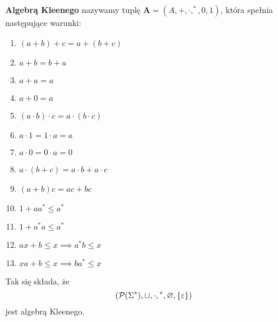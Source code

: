 \begin{definition}
    \textbf{Algebrą Kleenego} nazywamy tuplę \( \mathbf{A} = (A, +, \cdot, ^*, 0, 1) \), która spełnia następujące warunki:
    \begin{enumerate}
        \item \((a + b) + c = a + (b + c)\)
        \item \(a + b = b + a\)
        \item \(a + a = a\)
        \item \(a + 0 = a\)
        \item \( (a \cdot b) \cdot c = a \cdot (b \cdot c) \)
        \item \( a \cdot 1 = 1 \cdot a = a \)
        \item \( a \cdot 0 = 0 \cdot a = 0 \)
        \item \( a\cdot(b + c) = a\cdot b + a \cdot c \)
        \item \( (a + b)c = ac + bc \)
        \item \( 1 + aa^* \leq a^* \)
        \item \( 1 + a^*a \leq a^* \)
        \item \( ax + b \leq x \implies a^*b \leq x \)
        \item \( xa + b \leq x \implies ba^* \leq x \)
    \end{enumerate}
\end{definition}
Tak się składa, że
\begin{equation*}
    \pars{\powerset\pars{\Sigma^*}, {\cup}, {\cdot}, {}^*, \emptyset, \set{\eps}}
\end{equation*}
jest algebrą Kleenego.

